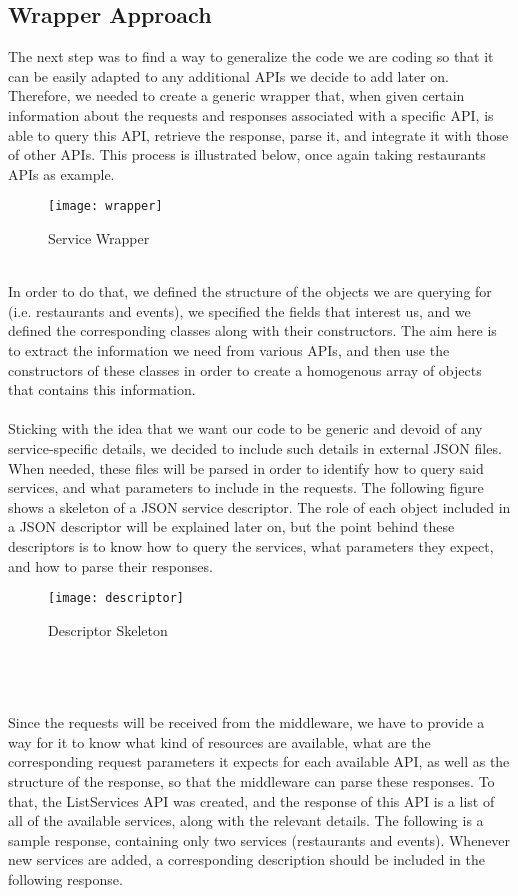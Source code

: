 \subsection{Wrapper Approach}
The next step was to find a way to generalize the code we are coding so that it can be easily adapted to any additional APIs we decide to add later on. Therefore, we needed to create a generic wrapper that, when given certain information about the requests and responses associated with a specific API, is able to query this API, retrieve the response, parse it, and integrate it with those of other APIs. This process is illustrated below, once again taking restaurants APIs as example.\\
\begin{figure}[h]
\centering
\texttt{[image: wrapper]}
\caption{Service Wrapper}
\end{figure}
\\
In order to do that, we defined the structure of the objects we are querying for (i.e. restaurants and events), we specified the fields that interest us, and we defined the corresponding classes along with their constructors. The aim here is to extract the information we need from various APIs, and then use the constructors of these classes in order to create a homogenous array of objects that contains this information.\\\\
Sticking with the idea that we want our code to be generic and devoid of any service-specific details, we decided to include such details in external JSON files. When needed, these files will be parsed in order to identify how to query said services, and what parameters to include in the requests. The following figure shows a skeleton of a JSON service descriptor. The role of each object included in a JSON descriptor will be explained later on, but the point behind these descriptors is to know how to query the services, what parameters they expect, and how to parse their responses.
\begin{figure}[h]
\centering
\texttt{[image: descriptor]}
\caption{Descriptor Skeleton}
\end{figure}
\\\\\\
Since the requests will be received from the middleware, we have to provide a way for it to know what kind of resources are available, what are the corresponding request parameters it expects for each available API, as well as the structure of the response, so that the middleware can parse these responses. To that, the ListServices API was created, and the response of this API is a list of all of the available services, along with the relevant details. The following is a sample response, containing only two services (restaurants and events). Whenever new services are added, a corresponding description should be included in the following response.
